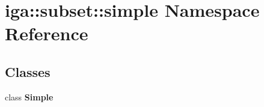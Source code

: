 \section{iga::subset::simple Namespace Reference}
\label{namespaceiga_1_1subset_1_1simple}


\subsection*{Classes}
\begin{CompactItemize}
\item 
class {\bf Simple}
\end{CompactItemize}

